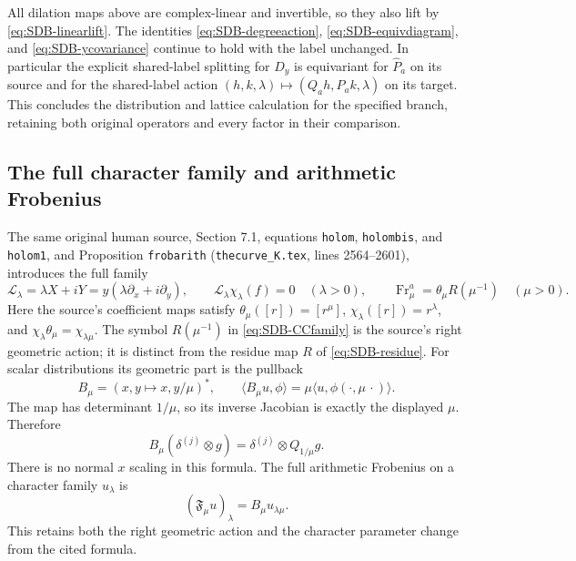 All dilation maps above are complex-linear and invertible, so they
also lift by \eqref{eq:SDB-linearlift}. The identities
\eqref{eq:SDB-degreeaction}, \eqref{eq:SDB-equivdiagram}, and
\eqref{eq:SDB-ycovariance} continue to hold with the label unchanged.
In particular the explicit shared-label splitting for $D_y$ is
equivariant for $\widehat P_a$ on its source and for the shared-label
action $(h,k,\lambda)\mapsto(Q_ah,P_ak,\lambda)$ on its target.
This concludes the distribution and lattice calculation for the
specified branch, retaining both original operators and every factor
in their comparison.

\subsection{The full character family and arithmetic Frobenius}

The same original human source, Section 7.1, equations
\texttt{holom}, \texttt{holombis}, and \texttt{holom1}, and
Proposition \texttt{frobarith} (\nolinkurl{thecurve_K.tex},
lines 2564--2601), introduces the full family
\begin{equation}\tag{SDB40}\label{eq:SDB-CCfamily}
 \mathcal L_\lambda=\lambda X+iY
       =y(\lambda\partial_x+i\partial_y),\qquad
 \mathcal L_\lambda\chi_\lambda(f)=0\quad(\lambda>0),
 \qquad
 \operatorname{Fr}^{a}_\mu=\theta_\mu R(\mu^{-1})\quad(\mu>0).
\end{equation}
Here the source's coefficient maps satisfy
$\theta_\mu([r])=[r^\mu]$,
$\chi_\lambda([r])=r^\lambda$, and
$\chi_\lambda\theta_\mu=\chi_{\lambda\mu}$.
The symbol $R(\mu^{-1})$ in \eqref{eq:SDB-CCfamily} is the
source's right geometric action; it is distinct from the residue
map $R$ of \eqref{eq:SDB-residue}.
For scalar distributions its geometric part is the pullback
\begin{equation}\tag{SDB41}\label{eq:SDB-Bpullback}
 B_\mu=(x,y\mapsto x,y/\mu)^*,\qquad
 \langle B_\mu u,\phi\rangle
       =\mu\langle u,\phi(\cdot,\mu\,\cdot)\rangle.
\end{equation}
The map has determinant $1/\mu$, so its inverse Jacobian is
exactly the displayed $\mu$. Therefore
\begin{equation}\tag{SDB42}\label{eq:SDB-Bjet}
 B_\mu(\delta^{(j)}\otimes g)
       =\delta^{(j)}\otimes Q_{1/\mu}g.
\end{equation}
There is no normal $x$ scaling in this formula. The full
arithmetic Frobenius on a character family $u_\lambda$ is
\begin{equation}\tag{SDB43}\label{eq:SDB-frobeniusfamily}
 (\mathfrak F_\mu u)_\lambda=B_\mu u_{\lambda\mu}.
\end{equation}
This retains both the right geometric action and the character
parameter change from the cited formula.

